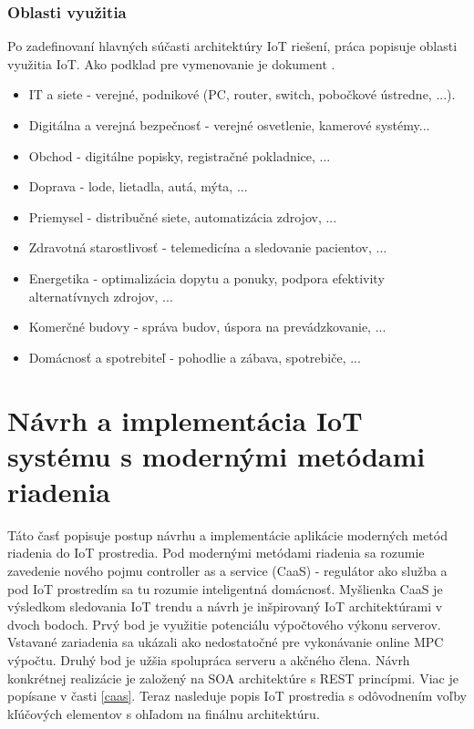 \subsubsection{Oblasti využitia}
Po zadefinovaní hlavných súčasti architektúry IoT riešení, práca popisuje oblasti využitia IoT. Ako podklad pre vymenovanie je dokument \cite{IOT24}.
\begin{itemize}
\item IT a siete - verejné, podnikové (PC, router, switch, pobočkové ústredne, ...).
\item Digitálna a verejná bezpečnosť - verejné osvetlenie, kamerové systémy...
\item Obchod - digitálne popisky, registračné pokladnice, ... 
\item Doprava - lode, lietadla, autá, mýta, ...
\item Priemysel - distribučné siete, automatizácia zdrojov, ...
\item Zdravotná starostlivosť - telemedicína a sledovanie pacientov, ...
\item Energetika - optimalizácia dopytu a ponuky, podpora efektivity alternatívnych zdrojov, ...
\item Komerčné budovy - správa budov, úspora na prevádzkovanie, ...
\item Domácnosť a spotrebiteľ - pohodlie a zábava, spotrebiče, ...
\end{itemize}
 

\section{Návrh a implementácia IoT systému s modernými metódami riadenia}
Táto časť popisuje postup návrhu a implementácie aplikácie moderných metód riadenia do IoT prostredia. Pod modernými metódami riadenia sa rozumie zavedenie nového pojmu controller as a service (CaaS) - regulátor ako služba a pod IoT prostredím sa tu rozumie inteligentná domácnosť. Myšlienka CaaS je výsledkom sledovania IoT trendu a návrh je inšpirovaný IoT architektúrami v dvoch bodoch. Prvý bod je využitie potenciálu výpočtového výkonu serverov. Vstavané zariadenia sa ukázali ako nedostatočné pre vykonávanie online MPC výpočtu. Druhý bod je užšia spolupráca serveru a akčného člena.  Návrh konkrétnej realizácie je založený na SOA architektúre s REST princípmi. Viac je popísane v časti \ref{caas}. 
Teraz nasleduje popis IoT prostredia s odôvodnením voľby kľúčových elementov s ohľadom na finálnu architektúru.
